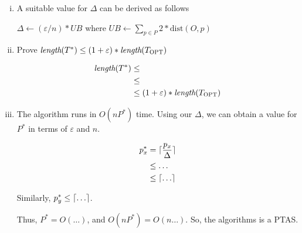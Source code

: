 \begin{enumerate}[(i)]
	\item A suitable value for $\Delta$ can be derived as follows

\begin{sourcecode}
$\Delta \leftarrow (\varepsilon / n) * UB$ where $UB \leftarrow \sum_{p \in P}{2 * \text{dist}(O, p)}$ 
\end{sourcecode}

	\item Prove $\textit{length}(T^*) \leq (1 + \varepsilon) * \textit{length}(T_{\textsc{OPT}})$

\begin{equation}
\begin{split}
\textit{length}(T^*)  &\leq \\
&\leq \\
&\leq (1 + \varepsilon) * \textit{length}(T_{\textsc{OPT}})
\end{split}
\end{equation}

	\item The algorithm runs in $O(nP^*)$ time.
		Using our $\Delta$, we can obtain a value for $P^*$ in terms of $\varepsilon$ and $n$.

		\begin{align}
			p^*_x &= \ceil{\frac{p_x}{\Delta}}\\
			      &\leq \ldots\\
			      &\leq \ceil{\dots}
		\end{align}

		Similarly, $p^*_y \leq \lceil\ldots\rceil$.

		Thus, $P^* = O(\ldots)$, and $O(nP^*) = O(n\ldots)$.
		So, the algorithms is a PTAS.
\end{enumerate}
